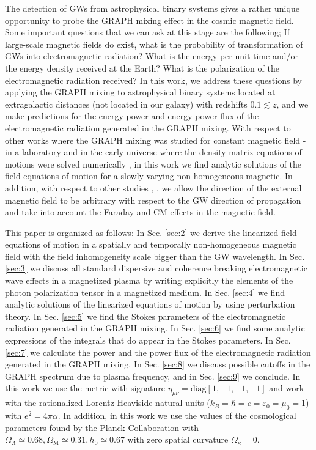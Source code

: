 \documentclass[a4paper,11pt]{article}
\begin{document}
 The detection of GWs from astrophysical binary systems gives a rather unique opportunity to probe the GRAPH mixing effect in the cosmic magnetic field. Some important questions that we can ask at this stage are the following; If large-scale magnetic fields do exist, what is the probability of transformation of GWs into electromagnetic radiation? What is the energy per unit time and/or the energy density received at the Earth? What is the polarization of the electromagnetic radiation received? In this work, we address these questions by applying the GRAPH mixing to astrophysical binary systems located at extragalactic distances (not located in our galaxy) with redshifts $0.1\lesssim z$, and we make predictions for the energy power and energy power flux of the electromagnetic radiation generated in the GRAPH mixing. With respect to other works where the GRAPH mixing was studied for constant magnetic field  \cite{Boccaletti70}-\cite{Bastianelli05} in a laboratory and in the early universe where the density matrix equations of motions were solved numerically \cite{Dolgov:2012be}, in this work we find analytic solutions of the field equations of motion for a slowly varying non-homogeneous magnetic. In addition, with respect to other studies \cite{Boccaletti70}, \cite{Bastianelli05}, \cite{Dolgov:2012be} we allow the direction of the external magnetic field to be arbitrary with respect to the GW direction of propagation and take into account the Faraday and CM effects in the magnetic field.
 
 This paper is organized as follows: In Sec. \ref{sec:2} we derive the linearized field equations of motion in a spatially and temporally non-homogeneous magnetic field with the field inhomogeneity scale bigger than the GW wavelength. In Sec. \ref{sec:3} we discuss all standard dispersive and coherence breaking electromagnetic wave effects in a magnetized plasma by writing explicitly the elements of the photon polarization tensor in a magnetized medium. In Sec. \ref{sec:4} we find analytic solutions of the linearized equations of motion by using perturbation theory. In Sec. \ref{sec:5} we find the Stokes parameters of the electromagnetic radiation generated in the GRAPH mixing. In Sec. \ref{sec:6} we find some analytic expressions of the integrals that do appear in the Stokes parameters. In Sec. \ref{sec:7} we calculate the power and the power flux of the electromagnetic radiation generated in the GRAPH mixing. In Sec. \ref{sec:8} we discuss possible cutoffs in the GRAPH spectrum due to plasma frequency, and in Sec. \ref{sec:9} we conclude. In this work we use the metric with signature $\eta_{\mu\nu}=\text{diag}[1, -1, -1, -1]$ and work with the rationalized Lorentz-Heaviside natural units ($k_B=\hbar=c=\varepsilon_0=\mu_0=1$) with $e^2=4\pi \alpha$. In addition, in this work we use the values of the cosmological parameters found by the Planck Collaboration \cite{Ade:2015xua}with $\Omega_\Lambda \simeq 0.68, \Omega_\text{M}\simeq 0.31, h_0\simeq 0.67$ with zero spatial curvature $\Omega_\kappa=0$.
 
\end{document}
